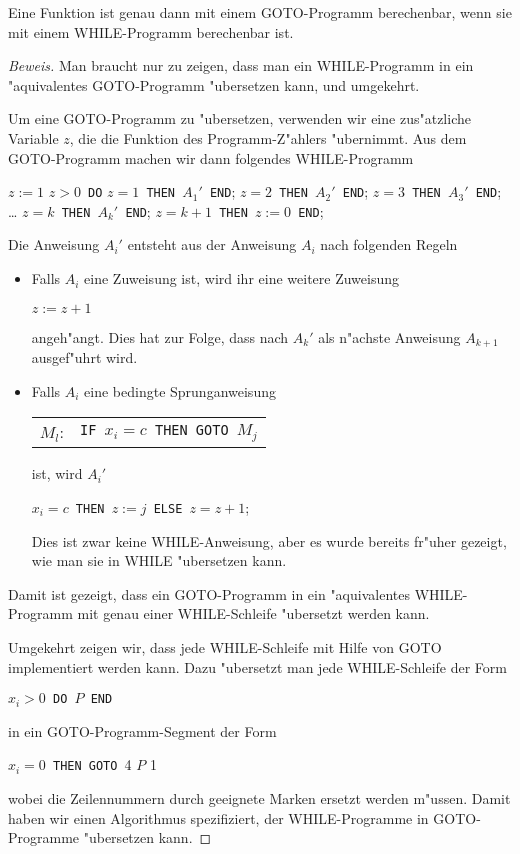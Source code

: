 \begin{satz}
Eine Funktion ist genau dann mit einem GOTO-Programm berechenbar,
wenn sie mit einem WHILE-Programm berechenbar ist.
\end{satz}
\begin{proof}[Beweis]
Man braucht nur zu zeigen, dass man ein WHILE-Programm in ein "aquivalentes
GOTO-Programm "ubersetzen kann, und umgekehrt.

Um eine GOTO-Programm zu "ubersetzen, verwenden wir eine zus"atzliche Variable
$z$, die die Funktion des Programm-Z"ahlers "ubernimmt.
Aus dem GOTO-Programm machen wir dann folgendes WHILE-Programm
\begin{algorithmic}
\STATE $z:=1$
$z>0${\tt\ DO}
$z=1${\tt\ THEN\ }$A_1'${\tt\ END};
$z=2${\tt\ THEN\ }$A_2'${\tt\ END};
$z=3${\tt\ THEN\ }$A_3'${\tt\ END};
\STATE\dots
{}$z=k${\tt\ THEN\ }$A_k'${\tt\ END};
$z=k+1${\tt\ THEN\ }$z:=0${\tt\ END};
\end{algorithmic}
Die Anweisung $A_i'$ entsteht aus der Anweisung $A_i$ nach folgenden
Regeln
\begin{itemize}
\item Falls $A_i$ eine Zuweisung ist, wird ihr eine weitere Zuweisung 
\begin{algorithmic}
\STATE $z:=z+1$
\end{algorithmic}
angeh"angt. Dies hat zur Folge, dass nach $A_k'$ als n"achste Anweisung
$A_{k+1}$ ausgef"uhrt wird.
\item
Falls $A_i$ eine bedingte Sprunganweisung
\begin{center}
\begin{tabular}{rl}
$M_l$:&{\tt IF\ }$x_i=c${\tt\ THEN GOTO\ }$M_j$
\end{tabular}
\end{center}
ist, wird $A_i'$
\begin{algorithmic}
$x_i=c${\tt\ THEN\ }$z:=j${\tt\ ELSE }$z=z+1$;
\end{algorithmic}
Dies ist zwar keine WHILE-Anweisung, aber es wurde bereits
fr"uher gezeigt, wie man sie in WHILE "ubersetzen kann.
\end{itemize}
Damit ist gezeigt, dass ein GOTO-Programm in ein "aquivalentes WHILE-Programm
mit genau einer WHILE-Schleife "ubersetzt werden kann.

Umgekehrt zeigen wir, dass jede WHILE-Schleife mit Hilfe von GOTO
implementiert werden kann. Dazu "ubersetzt man jede WHILE-Schleife
der Form
\begin{algorithmic}
$x_i>0${\tt\ DO }$P${\tt\ END}
\end{algorithmic}
in ein GOTO-Programm-Segment der Form
\begin{algorithmic}[1]
$x_i=0${\tt\ THEN GOTO }4
\STATE$P$
1
\STATE
\end{algorithmic}
wobei die Zeilennummern durch geeignete Marken ersetzt werden m"ussen.
Damit haben wir einen Algorithmus spezifiziert, der WHILE-Programme in
GOTO-Programme "ubersetzen kann.
\end{proof}

